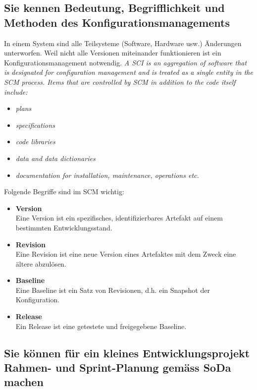\subsection{Sie kennen Bedeutung, Begrifflichkeit und Methoden des Konfigurationsmanagements}

In einem System sind alle Teilsysteme (Software, Hardware usw.) Änderungen unterworfen. Weil nicht alle Versionen miteinander funktionieren ist ein Konfigurationsmanagement notwendig. \emph{A \ac{SCI} is an aggregation of software that is designated for configuration management and is treated as a single entity in the \ac{SCM} process. Items that are controlled by \ac{SCM} in addition to the code itself include:}

\begin{itemize}
	\item \emph{plans}
	\item \emph{specifications}
	\item \emph{code libraries}
	\item \emph{data and data dictionaries}
	\item \emph{documentation for installation, maintenance, operations etc.}
\end{itemize} 

Folgende Begriffe sind im \ac{SCM} wichtig:

\begin{itemize}
	\item \textbf{Version} \\
		  Eine Version ist ein spezifisches, identifizierbares Artefakt auf einem bestimmten Entwicklungsstand.
	\item \textbf{Revision} \\
		  Eine Revision ist eine neue Version eines Artefaktes mit dem Zweck eine ältere abzulösen.
	\item \textbf{Baseline} \\
		  Eine Baseline ist ein Satz von Revisionen, d.h. ein Snapshot der Konfiguration.
	\item \textbf{Release} \\
		  Ein Release ist eine getestete und freigegebene Baseline.	  
\end{itemize}

\subsection{Sie können für ein kleines Entwicklungsprojekt Rahmen- und Sprint-Planung gemäss SoDa machen}

